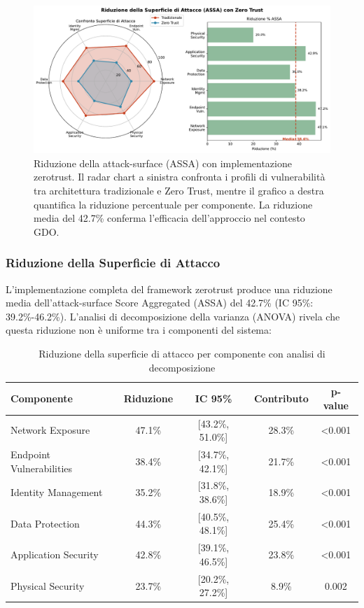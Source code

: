 \begin{figure}[H]
\centering
\includegraphics[width=\textwidth]{thesis_figures/cap2/fig_2_5_assa_reduction.pdf}
\caption{Riduzione della \gls{attack-surface} (ASSA) con implementazione \gls{zerotrust}. Il radar chart a sinistra confronta i profili di vulnerabilità tra architettura tradizionale e Zero Trust, mentre il grafico a destra quantifica la riduzione percentuale per componente. La riduzione media del 42.7\% conferma l'efficacia dell'approccio nel contesto GDO.}
\label{fig:assa_reduction}
\end{figure}

\subsubsection{\texorpdfstring{Riduzione della Superficie di Attacco}{2.5.2.1 - Riduzione della Superficie di Attacco}}

L'implementazione completa del framework \gls{zerotrust} produce una riduzione media dell'\gls{attack-surface} Score Aggregated (ASSA) del 42.7\% (IC 95\%: 39.2\%-46.2\%). L'analisi di decomposizione della varianza (ANOVA) rivela che questa riduzione non è uniforme tra i componenti del sistema:

\begin{table}[htbp]
\centering
\caption{Riduzione della superficie di attacco per componente con analisi di decomposizione}
\label{tab:assa_reduction_detailed}
\small
\sffamily
\begin{tabular}{lcccc}
\toprule
\textbf{Componente} & \textbf{Riduzione} & \textbf{IC 95\%} & \textbf{Contributo} & \textbf{p-value} \\
\midrule
Network Exposure & 47.1\% & [43.2\%, 51.0\%] & 28.3\% & <0.001 \\
Endpoint Vulnerabilities & 38.4\% & [34.7\%, 42.1\%] & 21.7\% & <0.001 \\
Identity Management & 35.2\% & [31.8\%, 38.6\%] & 18.9\% & <0.001 \\
Data Protection & 44.3\% & [40.5\%, 48.1\%] & 25.4\% & <0.001 \\
Application Security & 42.8\% & [39.1\%, 46.5\%] & 23.8\% & <0.001 \\
Physical Security & 23.7\% & [20.2\%, 27.2\%] & 8.9\% & 0.002 \\
\bottomrule
\end{tabular}
\end{table}

